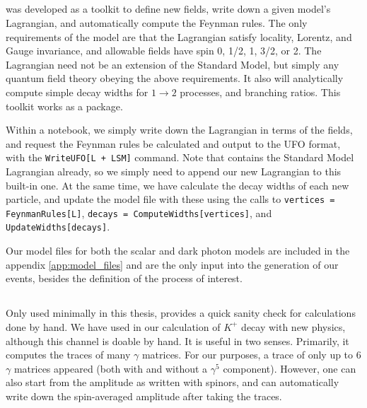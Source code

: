 \subsection{\feynrules}
\feynrules was developed as a toolkit to define new fields, write down a given model's Lagrangian, and automatically compute the Feynman rules.
The only requirements of the model are that the Lagrangian satisfy locality, Lorentz, and Gauge invariance, and allowable fields have spin 0, 1/2, 1, 3/2, or 2. The Lagrangian need not be an extension of the Standard Model, but simply any quantum field theory obeying the above requirements. 
It also will analytically compute simple decay widths for $1 \rightarrow 2$ processes, and branching ratios.
This toolkit works as a \mathematica package.

Within a \mathematica notebook, we simply write down the Lagrangian in terms of the fields, and request the Feynman rules be calculated and output to the UFO format, with the \texttt{WriteUFO[L + LSM]} command. Note that \feynrules contains the Standard Model Lagrangian already, so we simply need to append our new Lagrangian to this built-in one.
At the same time, we have \feynrules calculate the decay widths of each new particle, and update the model file with these using the calls to \texttt{vertices = FeynmanRules[L]}, \texttt{decays = ComputeWidths[vertices]}, and \texttt{UpdateWidths[decays]}.

Our model files for both the scalar and dark photon models are included in the appendix \ref{app:model_files} and are the only input into the generation of our events, besides the definition of the process of interest.

\subsection{\feyncalc}
Only used minimally in this thesis, \feyncalc provides a quick sanity check for calculations done by hand.
We have used \feyncalc in our calculation of $K^+$ decay with new physics, although this channel is doable by hand.
It is useful in two senses. Primarily, it computes the traces of many $\gamma$ matrices.
For our purposes, a trace of only up to 6 $\gamma$ matrices appeared (both with and without a $\gamma^5$ component).
However, one can also start from the amplitude as written with spinors, and \feyncalc can automatically write down the spin-averaged amplitude after taking the traces.

